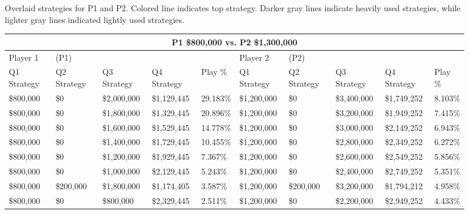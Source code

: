 \documentclass[11pt]{article}
\begin{document}
\begin{figure}
{
}
\caption{Overlaid strategies for P1 and P2. Colored line indicates top strategy. Darker gray lines indicate heavily used strategies, while lighter gray lines indicated lightly used strategies.}
\label{8v12.5}
\end{figure}

\begin{figure}
\tiny
\begin{tabular}{ |p{1.0cm}p{1.0cm}p{1.0cm}p{2.0cm}|p{1.0cm}||p{1.0cm}p{1.0cm}p{1.0cm}p{2.0cm}|p{1.0cm}|}
\hline
\multicolumn{10}{|c|}{P1 \$800,000 vs. P2 \$1,300,000} \\
\hline
Player 1 & (P1) & & & & Player 2 & (P2) & & & \\
\hline
Q1 Strategy & Q2 Strategy & Q3 Strategy & Q4 Strategy  &  Play \% & Q1 Strategy & Q2 Strategy & Q3 Strategy & Q4 Strategy  &  Play \%\\
\hline
\$800,000 & \$0 & \$2,000,000 & \$1,129,445 & 29.183\% & \$1,200,000 & \$0 & \$3,400,000 & \$1,749,252 & 8.103\% \\
\$800,000 & \$0 & \$1,800,000 & \$1,329,445 & 20.896\% & \$1,200,000 & \$0 & \$3,200,000 & \$1,949,252 & 7.415\% \\
\$800,000 & \$0 & \$1,600,000 & \$1,529,445 & 14.778\% & \$1,200,000 & \$0 & \$3,000,000 & \$2,149,252 & 6.943\% \\
\$800,000 & \$0 & \$1,400,000 & \$1,729,445 & 10.455\% & \$1,200,000 & \$0 & \$2,800,000 & \$2,349,252 & 6.272\% \\
\$800,000 & \$0 & \$1,200,000 & \$1,929,445 & 7.367\% & \$1,200,000 & \$0 & \$2,600,000 & \$2,549,252 & 5.856\% \\
\$800,000 & \$0 & \$1,000,000 & \$2,129,445 & 5.243\% & \$1,200,000 & \$0 & \$2,400,000 & \$2,749,252 & 5.351\% \\
\$800,000 & \$200,000 & \$1,800,000 & \$1,174,405 & 3.587\% & \$1,200,000 & \$200,000 & \$3,200,000 & \$1,794,212 & 4.958\% \\
\$800,000 & \$0 & \$800,000 & \$2,329,445 & 2.511\% & \$1,200,000 & \$0 & \$2,200,000 & \$2,949,252 & 4.433\% \\

\end{tabular}
\end{figure}
\end{document}
